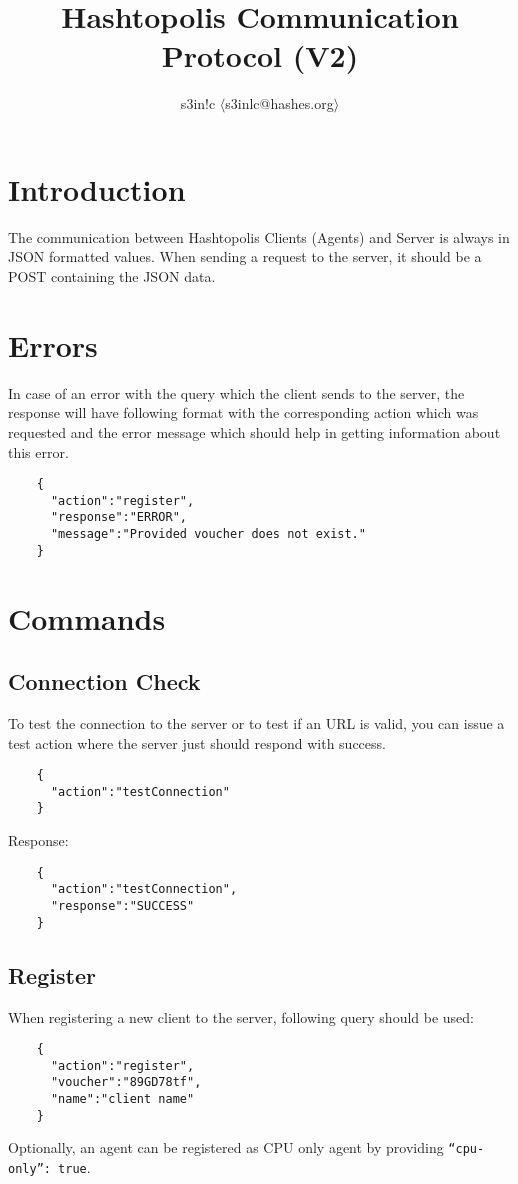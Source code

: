 \documentclass{article}
\author{s3in!c $\langle$s3inlc@hashes.org$\rangle$ }
\begin{document}
	\title{Hashtopolis Communication Protocol (V2)}
	\maketitle
	\section*{Introduction}
	The communication between Hashtopolis Clients (Agents) and Server is always in JSON formatted values. When sending a request to the server, it should be a POST containing the JSON data.

	\section*{Errors}
	In case of an error with the query which the client sends to the server, the response will have following format with the corresponding action which was requested and the error message which should help in getting information about this error.
	\begin{verbatim}
	{
	  "action":"register",
	  "response":"ERROR",
	  "message":"Provided voucher does not exist."
	}
	\end{verbatim}
	\pagebreak
	\section*{Commands}
	
	\subsection*{Connection Check}
	To test the connection to the server or to test if an URL is valid, you can issue a test action where the server just should respond with success.
	\begin{verbatim}
	{
	  "action":"testConnection"
	}
	\end{verbatim}
	Response:
	\begin{verbatim}
	{
	  "action":"testConnection",
	  "response":"SUCCESS"
	} 
	\end{verbatim}

	\subsection*{Register}
	When registering a new client to the server, following query should be used:
	\begin{verbatim}
	{
	  "action":"register",
	  "voucher":"89GD78tf",
	  "name":"client name"
	}
	\end{verbatim}
	Optionally, an agent can be registered as CPU only agent by providing \texttt{``cpu-only'': true}.
\end{document}
